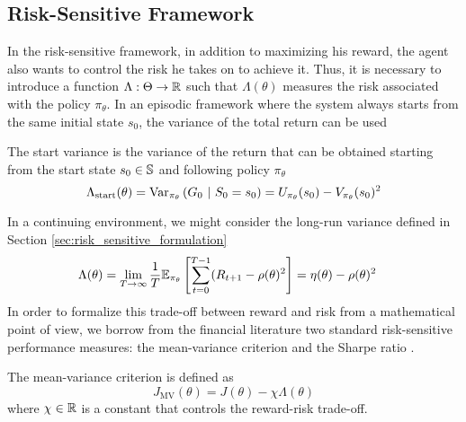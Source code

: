\subsection{Risk-Sensitive Framework}
In the risk-sensitive framework, in addition to maximizing his reward, the agent also wants to control the risk he takes on to achieve it. Thus, it is necessary to introduce a function $\Lambda: \Theta \to \R$ such that $\Lambda(\theta)$ measures the risk associated with the policy $\pi_\theta$. In an episodic framework where the system always starts from the same initial state $s_0$, the variance of the total return can be used \cite{tamar2012policy}
\begin{definition}
	The start variance is the variance of the return that can be obtained starting from the start state $s_0 \in \S$ and following policy $\pi_\theta$
	\begin{equation}
		\Lambda_{\text{start}}(\theta) = \Var[\pi_\theta]{G_0\ |\ S_0 = s_0}
			= U_{\pi_\theta} (s_0) - V_{\pi_\theta} (s_0)^2 
	\end{equation}
\end{definition}
In a continuing environment, we might consider the long-run variance \cite{prashanth2014actor} defined in Section \ref{sec:risk_sensitive_formulation}
\begin{equation}
	\begin{split}
		\Lambda(\theta) &= \lim_{T \to \infty} \frac{1}{T} \E[\pi_\theta]{
		\sum^{T-1}_{t=0} (R_{t+1} - \rho(\theta)^2} = \eta(\theta) - \rho(\theta)^2
	\end{split}
\end{equation}
In order to formalize this trade-off between reward and risk from a mathematical point of view, we borrow from the financial literature two standard risk-sensitive performance measures: the mean-variance criterion \cite{markowitz1952portfolio} and the Sharpe ratio \cite{sharpe1994sharpe}.
\begin{definition}
	The mean-variance criterion is defined as 
	\begin{equation}
		J_\text{MV}(\theta) = J(\theta) - \chi \Lambda(\theta)
	\end{equation}
	where $\chi \in \R$ is a constant that controls the reward-risk trade-off. 
\end{definition} 


